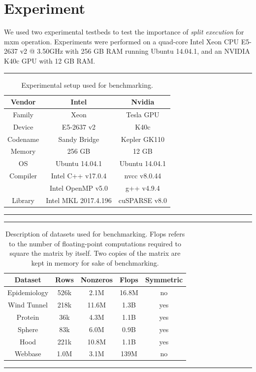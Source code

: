 \section{Experiment}
\label{Sec:experiment}

We used two experimental testbeds to test the importance of \emph{split execution} for {\sf mxm} operation. Experiments were performed on a quad-core Intel Xeon CPU E5-2637 v2 @ 3.50GHz with 256 GB RAM running Ubuntu 14.04.1, and an NVIDIA K40c GPU with 12 GB RAM.

\begin{table}[htb]
	\hrule
	\caption{Experimental setup used for benchmarking.}
	\label{Tab:testbed}
	\begin{center}
	\begin{tabular}{|c|c|c|} \hline
		Vendor & Intel & Nvidia \\ \hline
		Family & Xeon & Tesla GPU \\
		Device & E5-2637 v2 & K40c \\
		Codename & Sandy Bridge & Kepler GK110 \\
		Memory & 256 GB & 12 GB \\
		OS & Ubuntu 14.04.1 & Ubuntu 14.04.1 \\
		Compiler & Intel C++ v17.0.4 & nvcc v8.0.44 \\
		 & Intel OpenMP v5.0 & g++ v4.9.4 \\
		Library & Intel MKL 2017.4.196 & cuSPARSE v8.0 \\ \hline
	\end{tabular}
	\end{center}
	\hrule
\end{table}

\begin{table}[htb]
	\hrule
	\caption{Description of datasets used for benchmarking. Flops refers to the number of floating-point computations required to square the matrix by itself. Two copies of the matrix are kept in memory for sake of benchmarking.}
	\label{Tab:testset}
	\begin{center}
		\begin{tabular}{|c|c|c|c|c|} \hline
			Dataset & Rows & Nonzeros & Flops & Symmetric\\ \hline
			Epidemiology & 526k & 2.1M & 16.8M & no \\
			Wind Tunnel & 218k & 11.6M & 1.3B & yes \\
			Protein & 36k & 4.3M & 1.1B & yes\\
			Sphere & 83k & 6.0M & 0.9B & yes\\
			Hood & 221k & 10.8M & 1.1B & yes \\
			Webbase & 1.0M & 3.1M & 139M & no \\ \hline
		\end{tabular}
	\end{center}
	\hrule
\end{table}

